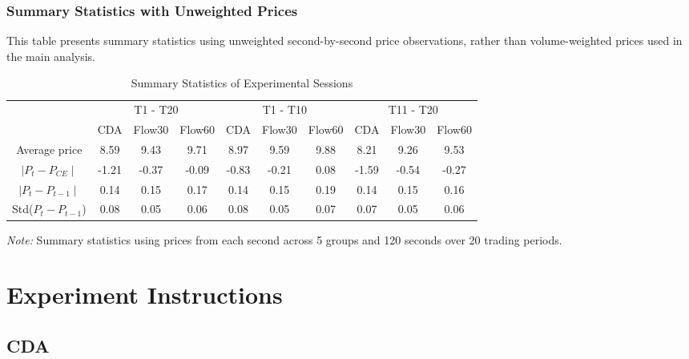 \documentclass[12pt]{article}
\begin{document}
\begin{singlespace}
\subsubsection{Summary Statistics with Unweighted Prices}

This table presents summary statistics using unweighted second-by-second price observations, rather than volume-weighted prices used in the main analysis.

\begin{table}[H]
    \centering
    \caption{Summary Statistics of Experimental Sessions}
    \begin{threeparttable}
    \begin{tabular}{cccccccccc}
    \toprule
     & \multicolumn{3}{c}{T1 - T20} & \multicolumn{3}{c}{T1 - T10}  & \multicolumn{3}{c}{T11 - T20}  \\
     & CDA          & Flow30          & Flow60          & CDA           & Flow30          & Flow60          & CDA        & Flow30          & Flow60           \\
    \midrule
    Average price & 8.59 & 9.43 & 9.71 & 8.97 & 9.59 & 9.88 & 8.21 & 9.26 & 9.53 \\
    $\mid P_t - P_{CE} \mid$ & -1.21 & -0.37 & -0.09 & -0.83 & -0.21 & 0.08 & -1.59 & -0.54 & -0.27 \\
    $\mid P_{t} - P_{t - 1} \mid$ & 0.14 & 0.15 & 0.17 & 0.14 & 0.15 & 0.19 & 0.14 & 0.15 & 0.16 \\
    Std($P_{t} - P_{t - 1}$) & 0.08 & 0.05 & 0.06 & 0.08 & 0.05 & 0.07 & 0.07 & 0.05 & 0.06 \\
    \bottomrule
    \end{tabular}
    \begin{tablenotes}
    \item \small \textit{Note:} Summary statistics using prices from each second across 5 groups and 120 seconds over 20 trading periods.
    \end{tablenotes}
    \end{threeparttable}
    \label{tab:summary_stat_raw}
\end{table}

\newpage

\section{Experiment Instructions}
\subsection{CDA} \label{app_instruction_cda}


\end{singlespace}
\end{document}
